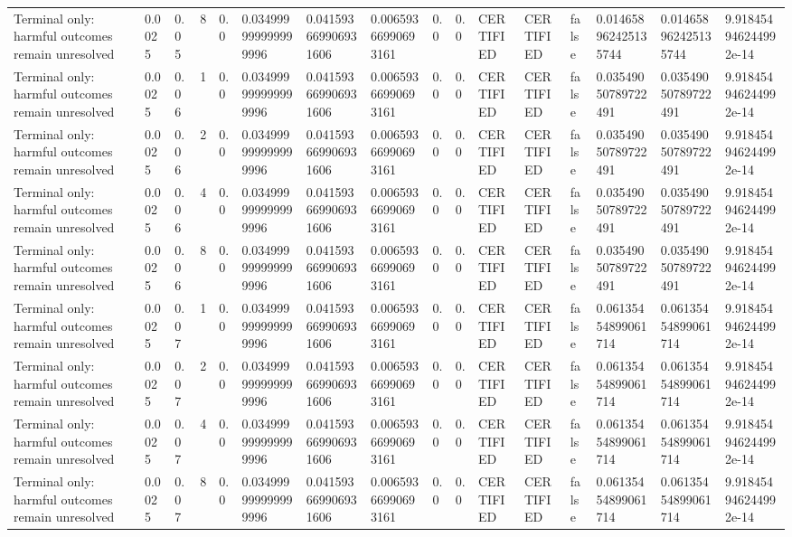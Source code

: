 \begin{tabular}{llllllllllllllll}
Terminal only: harmful outcomes remain unresolved & 0.0025 & 0.05 & 8 & 0.0 & 0.034999999999999996 & 0.041593669906931606 & 0.00659366990693161 & 0.0 & 0.0 & CERTIFIED & CERTIFIED & false & 0.014658962425135744 & 0.014658962425135744 & 9.918454946244992e-14 \\
Terminal only: harmful outcomes remain unresolved & 0.0025 & 0.06 & 1 & 0.0 & 0.034999999999999996 & 0.041593669906931606 & 0.00659366990693161 & 0.0 & 0.0 & CERTIFIED & CERTIFIED & false & 0.03549050789722491 & 0.03549050789722491 & 9.918454946244992e-14 \\
Terminal only: harmful outcomes remain unresolved & 0.0025 & 0.06 & 2 & 0.0 & 0.034999999999999996 & 0.041593669906931606 & 0.00659366990693161 & 0.0 & 0.0 & CERTIFIED & CERTIFIED & false & 0.03549050789722491 & 0.03549050789722491 & 9.918454946244992e-14 \\
Terminal only: harmful outcomes remain unresolved & 0.0025 & 0.06 & 4 & 0.0 & 0.034999999999999996 & 0.041593669906931606 & 0.00659366990693161 & 0.0 & 0.0 & CERTIFIED & CERTIFIED & false & 0.03549050789722491 & 0.03549050789722491 & 9.918454946244992e-14 \\
Terminal only: harmful outcomes remain unresolved & 0.0025 & 0.06 & 8 & 0.0 & 0.034999999999999996 & 0.041593669906931606 & 0.00659366990693161 & 0.0 & 0.0 & CERTIFIED & CERTIFIED & false & 0.03549050789722491 & 0.03549050789722491 & 9.918454946244992e-14 \\
Terminal only: harmful outcomes remain unresolved & 0.0025 & 0.07 & 1 & 0.0 & 0.034999999999999996 & 0.041593669906931606 & 0.00659366990693161 & 0.0 & 0.0 & CERTIFIED & CERTIFIED & false & 0.06135454899061714 & 0.06135454899061714 & 9.918454946244992e-14 \\
Terminal only: harmful outcomes remain unresolved & 0.0025 & 0.07 & 2 & 0.0 & 0.034999999999999996 & 0.041593669906931606 & 0.00659366990693161 & 0.0 & 0.0 & CERTIFIED & CERTIFIED & false & 0.06135454899061714 & 0.06135454899061714 & 9.918454946244992e-14 \\
Terminal only: harmful outcomes remain unresolved & 0.0025 & 0.07 & 4 & 0.0 & 0.034999999999999996 & 0.041593669906931606 & 0.00659366990693161 & 0.0 & 0.0 & CERTIFIED & CERTIFIED & false & 0.06135454899061714 & 0.06135454899061714 & 9.918454946244992e-14 \\
Terminal only: harmful outcomes remain unresolved & 0.0025 & 0.07 & 8 & 0.0 & 0.034999999999999996 & 0.041593669906931606 & 0.00659366990693161 & 0.0 & 0.0 & CERTIFIED & CERTIFIED & false & 0.06135454899061714 & 0.06135454899061714 & 9.918454946244992e-14 \\

\end{tabular}
